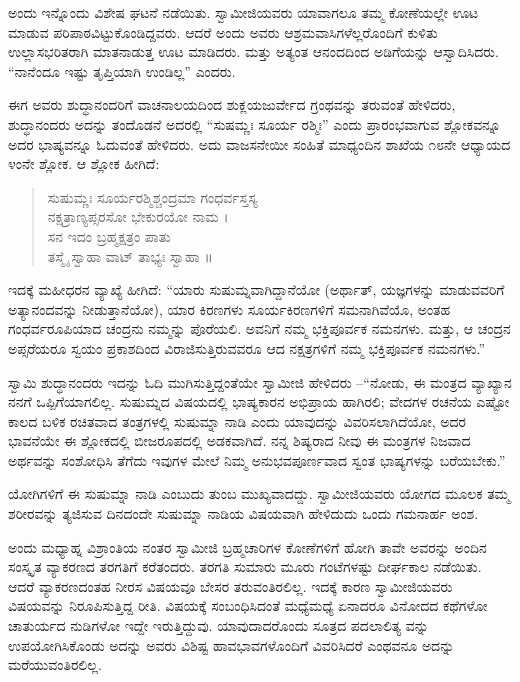 ಅಂದು ಇನ್ನೊಂದು ವಿಶೇಷ ಘಟನೆ ನಡೆಯಿತು. ಸ್ವಾಮೀಜಿಯವರು ಯಾವಾಗಲೂ ತಮ್ಮ ಕೋಣೆಯಲ್ಲೇ ಊಟ ಮಾಡುವ ಪರಿಪಾಠವಿಟ್ಟುಕೊಂಡಿದ್ದವರು. ಆದರೆ ಅಂದು ಅವರು ಆಶ್ರಮವಾಸಿಗಳೆಲ್ಲರೊಂದಿಗೆ ಕುಳಿತು ಉಲ್ಲಾಸಭರಿತರಾಗಿ ಮಾತನಾಡುತ್ತ ಊಟ ಮಾಡಿದರು. ಮತ್ತು ಅತ್ಯಂತ ಆನಂದದಿಂದ ಅಡಿಗೆಯನ್ನು ಆಸ್ವಾದಿಸಿದರು. “ನಾನೆಂದೂ ಇಷ್ಟು ತೃಪ್ತಿಯಾಗಿ ಉಂಡಿಲ್ಲ” ಎಂದರು.

ಈಗ ಅವರು ಶುದ್ಧಾನಂದರಿಗೆ ವಾಚನಾಲಯದಿಂದ ಶುಕ್ಲಯಜುರ್ವೇದ ಗ್ರಂಥವನ್ನು ತರುವಂತೆ ಹೇಳಿದರು, ಶುದ್ಧಾನಂದರು ಅದನ್ನು ತಂದೊಡನೆ ಅದರಲ್ಲಿ “ಸುಷಮ್ಣಃ ಸೂರ್ಯ ರಶ್ಮಿಃ” ಎಂದು ಪ್ರಾರಂಭವಾಗುವ ಶ್ಲೋಕವನ್ನೂ ಅದರ ಭಾಷ್ಯವನ್ನೂ ಓದುವಂತೆ ಹೇಳಿದರು. ಅದು ವಾಜಸನೇಯೀ ಸಂಹಿತೆ ಮಾಧ್ಯಂದಿನ ಶಾಖೆಯ ೧೮ನೇ ಆಧ್ಯಾಯದ ೪ಂನೇ ಶ್ಲೋಕ. ಆ ಶ್ಲೋಕ ಹೀಗಿದೆ:

\begin{verse}
ಸುಷುಮ್ಣಃ ಸೂರ್ಯರಶ್ಮಿಶ್ಚಂದ್ರಮಾ ಗಂಧರ್ವಸ್ತಸ್ಯ\\ನಕ್ಷತ್ರಾಣ್ಯಪ್ಸರಸೋ ಭೇಕುರಯೋ ನಾಮ ।\\ಸನ ಇದಂ ಬ್ರಹ್ಮಕ್ಷತ್ರಂ ಪಾತು\\ತಸ್ಮೈ ಸ್ವಾಹಾ ವಾಟ್ ತಾಭ್ಯಃ ಸ್ವಾಹಾ ॥
\end{verse}

ಇದಕ್ಕೆ ಮಹೀಧರನ ವ್ಯಾಖ್ಯೆ ಹೀಗಿದೆ: “ಯಾರು ಸುಷುಮ್ನವಾಗಿದ್ದಾನೆಯೋ (ಅರ್ಥಾತ್, ಯಜ್ಞಗಳನ್ನು ಮಾಡುವವರಿಗೆ ಅತ್ಯಾನಂದವನ್ನು ನೀಡುತ್ತಾನೆಯೋ), ಯಾರ ಕಿರಣಗಳು ಸೂರ್ಯಕಿರಣಗಳಿಗೆ ಸಮನಾಗಿವೆಯೊ, ಅಂತಹ ಗಂಧರ್ವರೂಪಿಯಾದ ಚಂದ್ರನು ನಮ್ಮನ್ನು ಪೊರೆಯಲಿ. ಅವನಿಗೆ ನಮ್ಮ ಭಕ್ತಿಪೂರ್ವಕ ನಮನಗಳು. ಮತ್ತು, ಆ ಚಂದ್ರನ ಅಪ್ಸರೆಯರೂ ಸ್ವಯಂ ಪ್ರಕಾಶದಿಂದ ವಿರಾಜಿಸುತ್ತಿರುವವರೂ ಆದ ನಕ್ಷತ್ರಗಳಿಗೆ ನಮ್ಮ ಭಕ್ತಿಪೂರ್ವಕ ನಮನಗಳು.”

ಸ್ವಾಮಿ ಶುದ್ಧಾನಂದರು ಇದನ್ನು ಓದಿ ಮುಗಿಸುತ್ತಿದ್ದಂತೆಯೇ ಸ್ವಾಮೀಜಿ ಹೇಳಿದರು –“ನೋಡು, ಈ ಮಂತ್ರದ ವ್ಯಾಖ್ಯಾನ ನನಗೆ ಒಪ್ಪಿಗೆಯಾಗಲಿಲ್ಲ. ಸುಷುಮ್ನದ ವಿಷಯದಲ್ಲಿ ಭಾಷ್ಯಕಾರನ ಅಭಿಪ್ರಾಯ ಹಾಗಿರಲಿ; ವೇದಗಳ ರಚನೆಯ ಎಷ್ಟೋ ಕಾಲದ ಬಳಿಕ ರಚಿತವಾದ ತಂತ್ರಗಳಲ್ಲಿ ಸುಷುಮ್ನಾ ನಾಡಿ ಎಂದು ಯಾವುದನ್ನು ವಿವರಿಸಲಾಗಿದೆಯೋ, ಅದರ ಭಾವನೆಯೇ ಈ ಶ್ಲೋಕದಲ್ಲಿ ಬೀಜರೂಪದಲ್ಲಿ ಅಡಕವಾಗಿದೆ. ನನ್ನ ಶಿಷ್ಯರಾದ ನೀವು ಈ ಮಂತ್ರಗಳ ನಿಜವಾದ ಅರ್ಥವನ್ನು ಸಂಶೋಧಿಸಿ ತೆಗೆದು ಇವುಗಳ ಮೇಲೆ ನಿಮ್ಮ ಅನುಭವಪೂರ್ಣವಾದ ಸ್ವಂತ ಭಾಷ್ಯಗಳನ್ನು ಬರೆಯಬೇಕು.”

ಯೋಗಿಗಳಿಗೆ ಈ ಸುಷುಮ್ನಾ ನಾಡಿ ಎಂಬುದು ತುಂಬ ಮುಖ್ಯವಾದದ್ದು. ಸ್ವಾಮೀಜಿಯವರು ಯೋಗದ ಮೂಲಕ ತಮ್ಮ ಶರೀರವನ್ನು ತ್ಯಜಿಸುವ ದಿನದಂದೇ ಸುಷುಮ್ನಾ ನಾಡಿಯ ವಿಷಯವಾಗಿ ಹೇಳಿದುದು ಒಂದು ಗಮನಾರ್ಹ ಅಂಶ.

ಅಂದು ಮಧ್ಯಾಹ್ನ ವಿಶ್ರಾಂತಿಯ ನಂತರ ಸ್ವಾಮೀಜಿ ಬ್ರಹ್ಮಚಾರಿಗಳ ಕೋಣೆಗಳಿಗೆ ಹೋಗಿ ತಾವೇ ಅವರನ್ನು ಅಂದಿನ ಸಂಸ್ಕೃತ ವ್ಯಾಕರಣದ ತರಗತಿಗೆ ಕರೆತಂದರು. ತರಗತಿ ಸುಮಾರು ಮೂರು ಗಂಟೆಗಳಷ್ಟು ದೀರ್ಘಕಾಲ ನಡೆಯಿತು. ಆದರೆ ವ್ಯಾಕರಣದಂತಹ ನೀರಸ ವಿಷಯವೂ ಬೇಸರ ತರುವಂತಿರಲಿಲ್ಲ. ಇದಕ್ಕೆ ಕಾರಣ ಸ್ವಾಮೀಜಿಯವರು ವಿಷಯವನ್ನು ನಿರೂಪಿಸುತ್ತಿದ್ದ ರೀತಿ. ವಿಷಯಕ್ಕೆ ಸಂಬಂಧಿಸಿದಂತೆ ಮಧ್ಯೆಮಧ್ಯೆ ಏನಾದರೂ ವಿನೋದದ ಕಥೆಗಳೋ ಚಾತುರ್ಯದ ನುಡಿಗಳೋ ಇದ್ದೇ ಇರುತ್ತಿದ್ದುವು. ಯಾವುದಾದರೊಂದು ಸೂತ್ರದ ಪದಲಾಲಿತ್ಯ ವನ್ನು ಉಪಯೋಗಿಸಿಕೊಂಡು ಅದನ್ನು ಅವರು ವಿಶಿಷ್ಟ ಹಾವಭಾವಗಳೊಂದಿಗೆ ವಿವರಿಸಿದರೆ ಎಂಥವನೂ ಅದನ್ನು ಮರೆಯುವಂತಿರಲಿಲ್ಲ.

